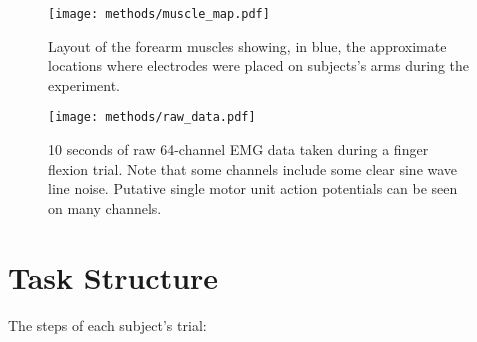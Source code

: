 \documentclass[../main.tex]{subfiles}
\begin{document}
\begin{figure}[tph]
  \centering
  \texttt{[image: methods/muscle\_map.pdf]}
  \caption[Electrode layout with forearm and hand muscles]{Layout of the forearm muscles showing, in blue, the approximate locations where electrodes were placed on subjects's arms during the experiment.}\label{fig:muscle_map}
\end{figure}

\begin{figure}[tph]
  \centering
  \texttt{[image: methods/raw\_data.pdf]}
  \caption[Example raw EMG data]{10 seconds of raw 64-channel EMG data taken during a finger flexion trial. Note that some channels include some clear sine wave line noise. Putative single motor unit action potentials can be seen on many channels.}\label{fig:raw_data}
\end{figure}





\section{Task Structure}

The steps of each subject's trial:
\end{document}
